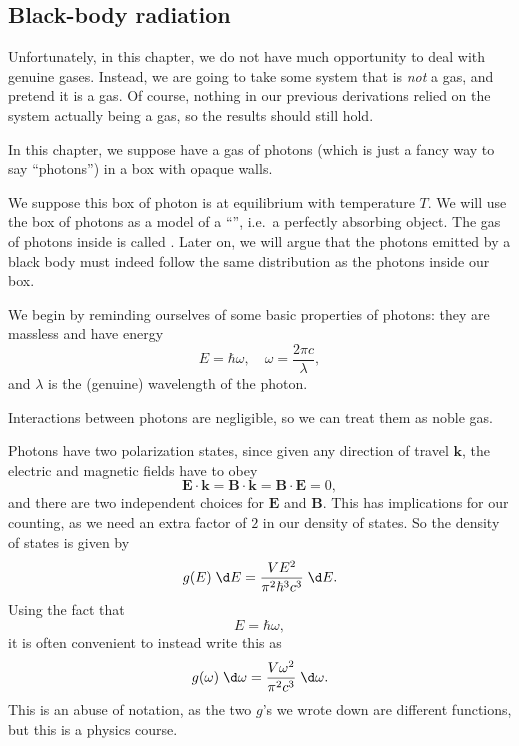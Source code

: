 \documentclass[a4paper]{article}
\begin{document}
\subsection{Black-body radiation}
Unfortunately, in this chapter, we do not have much opportunity to deal with genuine gases. Instead, we are going to take some system that is \emph{not} a gas, and pretend it is a gas. Of course, nothing in our previous derivations relied on the system actually being a gas, so the results should still hold.

In this chapter, we suppose have a gas of photons (which is just a fancy way to say ``photons'') in a box with opaque walls.
\begin{center}
\end{center}
We suppose this box of photon is at equilibrium with temperature $T$. We will use the box of photons as a model of a ``'', i.e.\ a perfectly absorbing object. The gas of photons inside is called .
 Later on, we will argue that the photons emitted by a black body must indeed follow the same distribution as the photons inside our box.

We begin by reminding ourselves of some basic properties of photons: they are massless and have energy
\[
  E = \hbar \omega,\quad \omega = \frac{2\pi c}{\lambda},
\]
and $\lambda$ is the (genuine) wavelength of the photon.

Interactions between photons are negligible, so we can treat them as noble gas.

Photons have two polarization states, since given any direction of travel $\mathbf{k}$, the electric and magnetic fields have to obey
\[
  \mathbf{E} \cdot \mathbf{k} = \mathbf{B} \cdot \mathbf{k} = \mathbf{B} \cdot \mathbf{E} = 0,
\]
and there are two independent choices for $\mathbf{E}$ and $\mathbf{B}$. This has implications for our counting, as we need an extra factor of $2$ in our density of states. So the density of states is given by
\[
  g(E) \;\d E = \frac{VE^2}{\pi^2 \hbar^3 c^3}\;\d E.
\]
Using the fact that
\[
  E = \hbar \omega,
\]
it is often convenient to instead write this as
\[
  g(\omega)\; \d \omega = \frac{V \omega^2}{\pi^2 c^3}\;\d \omega.
\]
This is an abuse of notation, as the two $g$'s we wrote down are different functions, but this is a physics course.
\end{document}
